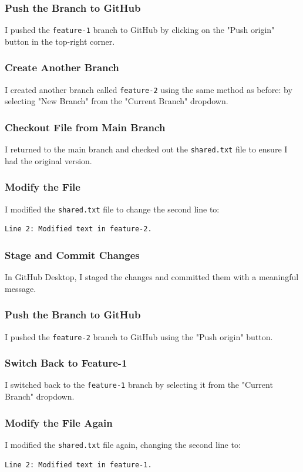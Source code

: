 \subsubsection{Push the Branch to GitHub}
I pushed the \texttt{feature-1} branch to GitHub by clicking on the "Push origin" button in the top-right corner.

\subsubsection{Create Another Branch}
I created another branch called \texttt{feature-2} using the same method as before: by selecting "New Branch" from the "Current Branch" dropdown.

\subsubsection{Checkout File from Main Branch}
I returned to the main branch and checked out the \texttt{shared.txt} file to ensure I had the original version.

\subsubsection{Modify the File}
I modified the \texttt{shared.txt} file to change the second line to:
\begin{verbatim}
Line 2: Modified text in feature-2.
\end{verbatim}

\subsubsection{Stage and Commit Changes}
In GitHub Desktop, I staged the changes and committed them with a meaningful message.

\subsubsection{Push the Branch to GitHub}
I pushed the \texttt{feature-2} branch to GitHub using the "Push origin" button.

\subsubsection{Switch Back to Feature-1}
I switched back to the \texttt{feature-1} branch by selecting it from the "Current Branch" dropdown.

\subsubsection{Modify the File Again}
I modified the \texttt{shared.txt} file again, changing the second line to:
\begin{verbatim}
Line 2: Modified text in feature-1.
\end{verbatim}

